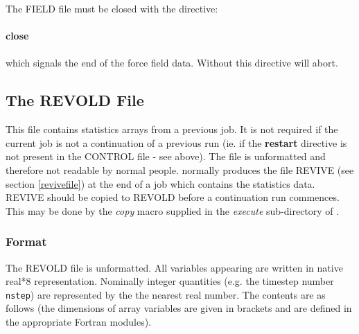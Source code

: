 The FIELD file must be closed with the directive:

\paragraph*{close}
\paragraph*{}

\noindent
which signals the end of the force field data. Without this directive
\D{} will abort.

\subsection{The REVOLD File}
\label{revoldfile}

This file contains statistics arrays from a previous job. It is not
required if the current job is not a continuation of a previous run
(ie.  if the {\bf restart} directive is not present in the CONTROL
file - see above). The file is unformatted and therefore not readable
by normal people. \D{} normally produces the file REVIVE (see section
\ref{revivefile}) at the end of a job which contains the statistics
data. REVIVE should be copied to REVOLD before a continuation run
commences. This may be done by the {\sl copy} macro supplied in the
{\em execute} sub-directory of \D{}.

\subsubsection{Format}
The REVOLD file is unformatted. All variables appearing are written in
native real*8 representation. Nominally integer quantities (e.g. the
timestep number {\tt nstep}) are represented by the the nearest real
number. The contents are as follows (the dimensions of array variables
are given in brackets and are defined in the appropriate Fortran modules).

